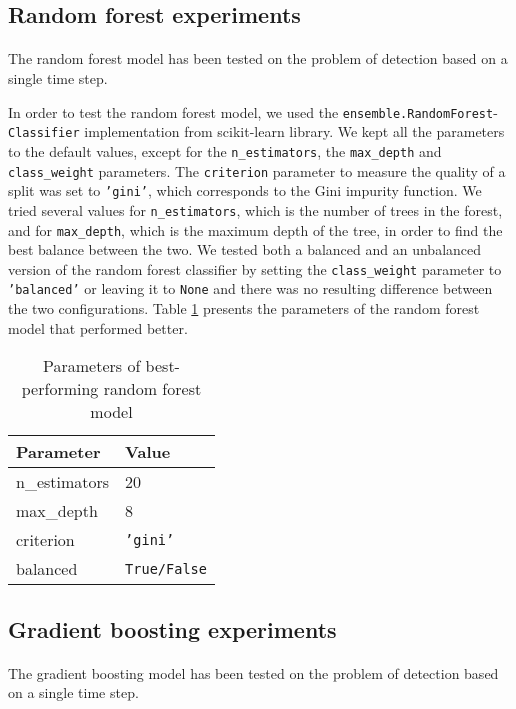 \subsection{Random forest experiments}
\paragraph{} The random forest model has been tested on the problem of detection based on a single time step.

In order to test the random forest model, we used the \texttt{ensemble.RandomForest}-\texttt{Classifier} implementation from scikit-learn library. We kept all the parameters to the default values, except for the \texttt{n\_estimators}, the \texttt{max\_depth} and \texttt{class\_weight} parameters. The \texttt{criterion} parameter to measure the quality of a split was set to \texttt{'gini'}, which corresponds to the Gini impurity function. We tried several values for \texttt{n\_estimators}, which is the number of trees in the forest, and for \texttt{max\_depth}, which is the maximum depth of the tree, in order to find the best balance between the two. We tested both a balanced and an unbalanced version of the random forest classifier by setting the \texttt{class\_weight} parameter to \texttt{'balanced'} or leaving it to \texttt{None} and there was no resulting difference between the two configurations. Table \ref{tab:randomforest_param} presents the parameters of the random forest model that performed better.
\begin{table}[htbp]
    \centering
    \begin{tabular}{ll}
        \hline
        \textbf{Parameter}  & \textbf{Value} \\\hline
        n\_estimators       & 20 \\
        max\_depth          & 8 \\
        criterion           & \texttt{'gini'} \\
        balanced            & \texttt{True/False} \\\hline
    \end{tabular}
    \caption{Parameters of best-performing random forest model}
    \label{tab:randomforest_param}
\end{table}

\subsection{Gradient boosting experiments}
\paragraph{} The gradient boosting model has been tested on the problem of detection based on a single time step.

